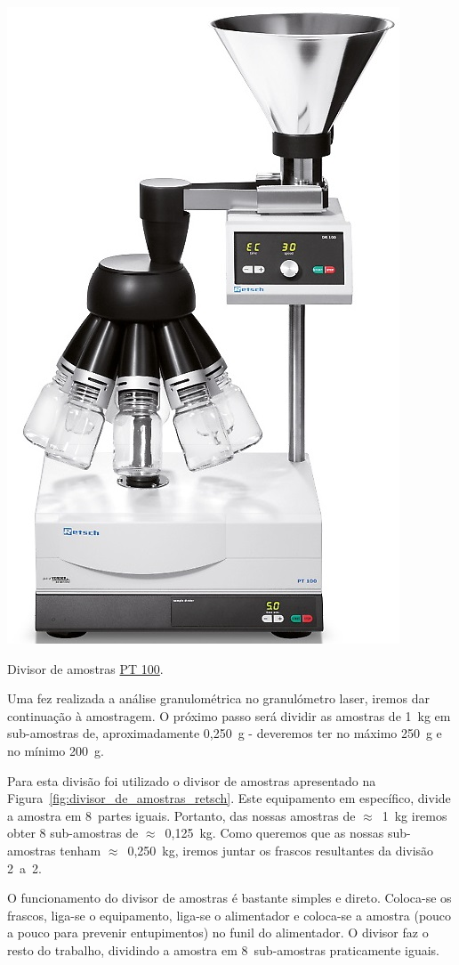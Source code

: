 \begin{marginfigure}[3\baselineskip]
    \centering
    \includegraphics[width=0.55\linewidth]{figures/divisor_de_amostras_retsch}
    \caption{Divisor de amostras \href{https://www.retsch.pt/pt/produtos/assistencia/amostradores/pt-100/}{PT 100}.}
    \label{fig:divisor_de_amostras_retsch}
\end{marginfigure}

Uma fez realizada a análise granulométrica no granulómetro laser, iremos dar continuação à amostragem.
O próximo passo será dividir as amostras de 1~kg em sub-amostras de, aproximadamente 0,250~g - deveremos ter no máximo 250~g e no mínimo 200~g.

Para esta divisão foi utilizado o divisor de amostras apresentado na Figura~\ref{fig:divisor_de_amostras_retsch}.
Este equipamento em específico, divide a amostra em 8~partes iguais.
Portanto, das nossas amostras de $\approx$~1~kg iremos obter 8 sub-amostras de $\approx$~0,125~kg.
Como queremos que as nossas sub-amostras tenham $\approx$~0,250~kg, iremos juntar os frascos resultantes da divisão 2~a~2.

O funcionamento do divisor de amostras é bastante simples e direto.
Coloca-se os frascos, liga-se o equipamento, liga-se o alimentador e coloca-se a amostra (pouco a pouco para prevenir entupimentos) no funil do alimentador.
O divisor faz o resto do trabalho, dividindo a amostra em 8~sub-amostras praticamente iguais.

